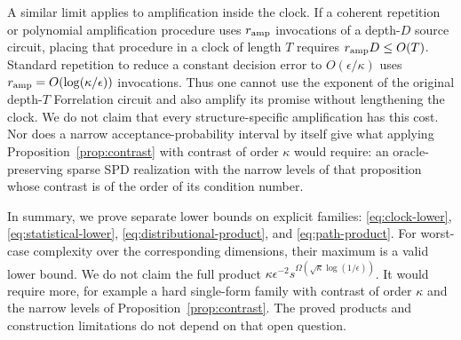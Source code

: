 A similar limit applies to amplification inside the clock. If a
coherent repetition or polynomial amplification procedure uses $r_{\rm amp}$ invocations of a depth-$D$ source circuit, placing that
procedure in a clock of length $T$ requires
$r_{\rm amp}D\leq O(T)$. Standard repetition to reduce a constant
decision error to $O(\epsilon/\kappa)$ uses
$r_{\rm amp}=O(\log(\kappa/\epsilon))$ invocations.
Thus one cannot use the exponent of the original depth-$T$ Forrelation
circuit and also amplify its promise without lengthening the clock. We
do not claim that every structure-specific amplification has this cost.
Nor does a narrow acceptance-probability interval by itself give what
applying Proposition~\ref{prop:contrast} with contrast of order
$\kappa$ would require: an oracle-preserving sparse SPD realization with
the narrow levels of that proposition whose contrast is of the order of
its condition number.

In summary, we prove separate lower bounds on explicit families:
\eqref{eq:clock-lower}, \eqref{eq:statistical-lower},
\eqref{eq:distributional-product}, and \eqref{eq:path-product}.
For worst-case complexity over the corresponding dimensions, their
maximum is a valid lower bound. We do not claim the full product
$\kappa\epsilon^{-2}s^{\Omega(\sqrt\kappa\log(1/\epsilon))}$.
It would require more, for example a hard single-form family with
contrast of order $\kappa$ and the narrow levels of
Proposition~\ref{prop:contrast}. The proved products and construction
limitations do not depend on that open question.
